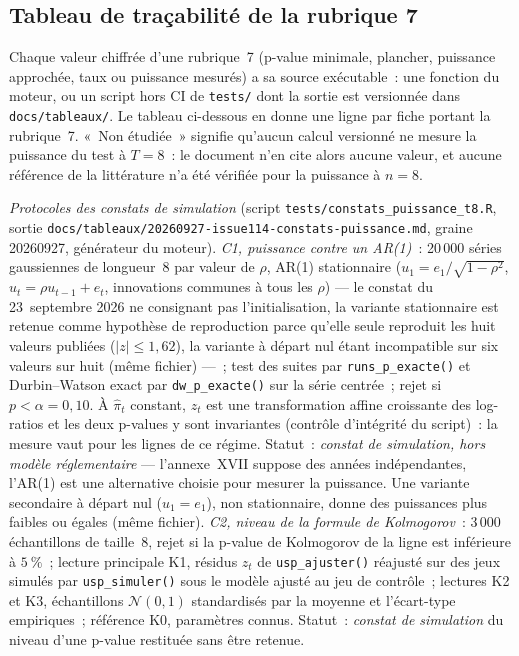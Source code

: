 \documentclass[a4paper,11pt]{article}
\newcommand{\code}[1]{\texttt{\small #1}}
\begin{document}
\subsection{Tableau de traçabilité de la rubrique 7}
\label{tab:tracabilite-puissance}

Chaque valeur chiffrée d'une rubrique~7 (p-value minimale, plancher, puissance approchée, taux ou
puissance mesurés) a sa source exécutable~: une fonction du moteur, ou un script hors CI de
\code{tests/} dont la sortie est versionnée dans \code{docs/tableaux/}. Le tableau ci-dessous en
donne une ligne par fiche portant la rubrique~7. «~Non étudiée~» signifie qu'aucun calcul
versionné ne mesure la puissance du test à $T = 8$~: le document n'en cite alors aucune valeur,
et aucune référence de la littérature n'a été vérifiée pour la puissance à $n = 8$.

\noindent\emph{Protocoles des constats de simulation} (script \code{tests/constats\_puissance\_t8.R},
sortie \code{docs/tableaux/}\newline \code{20260927-issue114-constats-puissance.md}, graine 20260927, générateur
du moteur). \emph{C1, puissance contre un AR(1)}~: 20\,000 séries gaussiennes de longueur~8 par
valeur de $\rho$, AR(1) stationnaire ($u_1 = e_1/\sqrt{1-\rho^2}$, $u_t = \rho u_{t-1} + e_t$,
innovations communes à tous les $\rho$) --- le constat du 23~septembre 2026 ne consignant pas
l'initialisation, la variante stationnaire est retenue comme hypothèse de reproduction parce
qu'elle seule reproduit les huit valeurs publiées ($|z| \le 1{,}62$), la variante à départ nul
étant incompatible sur six valeurs sur huit (même fichier) ---~; test des suites par \code{runs\_p\_exacte()} et
Durbin--Watson exact par \code{dw\_p\_exacte()} sur la série centrée~; rejet si $p < \alpha =
0{,}10$. À $\hat\pi_t$ constant, $z_t$ est une transformation affine croissante des log-ratios et
les deux p-values y sont invariantes (contrôle d'intégrité du script)~: la mesure vaut pour les
lignes de ce régime. Statut~: \emph{constat de simulation, hors modèle réglementaire} ---
l'annexe~XVII suppose des années indépendantes, l'AR(1) est une alternative choisie pour mesurer
la puissance. Une variante secondaire à départ nul ($u_1 = e_1$), non stationnaire, donne des
puissances plus faibles ou égales (même fichier). \emph{C2, niveau de la formule de
Kolmogorov}~: 3\,000 échantillons de taille~8, rejet si la p-value de Kolmogorov de la ligne est
inférieure à $5~\%$~; lecture principale K1, résidus $z_t$ de \code{usp\_ajuster()} réajusté sur
des jeux simulés par \code{usp\_simuler()} sous le modèle ajusté au jeu de contrôle~; lectures
K2 et K3, échantillons $\mathcal{N}(0,1)$ standardisés par la moyenne et l'écart-type empiriques~;
référence K0, paramètres connus. Statut~: \emph{constat de simulation} du niveau d'une p-value
restituée sans être retenue.
\end{document}
